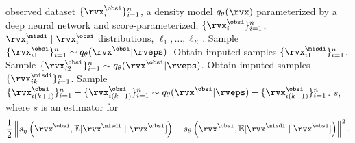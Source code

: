 \documentclass{article} %
\begin{document}
\begin{algorithm}[tb]
	\caption{Multilevel Monte Carlo}
	\label{alg:multilevel}
	\begin{algorithmic}[1]
		\REQUIRE observed dataset $\{\rvx_{i}^{\obsi}\}_{i=1}^{n}$, a density model $q_{\theta}(\rvx)$ parameterized by a deep neural network and score-parameterized, $\{\rvx_{i}^{\obsi}\}_{i=1}^{n}$, $\rvx_{i}^{\misdi} \mid \rvx_{i}^{\obsi}$ distributions, $\ell_{1}, \ldots, \ell_{K}$.
		\STATE Sample $\{\rvx_{i1}^{\obsi}\}_{i=1}^{n} \sim q_{\theta}(\rvx^{\obsi} | \rveps)$.
		\STATE Obtain imputed samples $\{\rvx_{i1}^{\misdi}\}_{i=1}^{n}$.
		\STATE Sample $\{\rvx_{i2}^{\obsi}\}_{i=1}^{n} \sim q_{\theta}(\rvx^{\obsi} | \rveps)$.
		\STATE Obtain imputed samples $\{\rvx_{ik}^{\misdi}\}_{i=1}^{n}$.
		\STATE Sample $\{\rvx_{i(k+1)}^{\obsi}\}_{i=1}^{n} - \{\rvx_{i(k-1)}^{\obsi}\}_{i=1}^{n} \sim q_{\theta}(\rvx^{\obsi} | \rveps) - \{\rvx_{i(k-1)}^{\obsi}\}_{i=1}^{n}$.
		\ENDFOR
		\RETURN $s$, where $s$ is an estimator for 
		\begin{align*}
			\frac{1}{2} \left\| s_{\eta} \left( \rvx^{\obsi}, \mathbb{E}[\rvx^{\misdi} \mid \rvx^{\obsi}] \right) - s_{\theta} \left( \rvx^{\obsi}, \mathbb{E}[\rvx^{\misdi} \mid \rvx^{\obsi}] \right) \right\|^{2}.
		\end{align*} 
	\end{algorithmic}
\end{algorithm}
\end{document}
